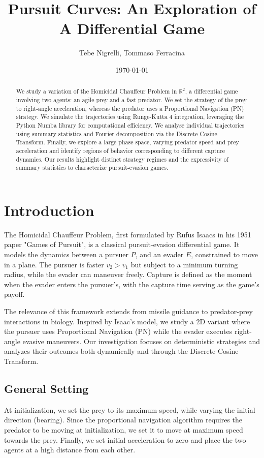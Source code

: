 \documentclass[11pt, twocolumn]{article}
\begin{document}
\title{Pursuit Curves: An Exploration of A Differential Game}

\author{Tebe Nigrelli, Tommaso Ferracina}
\date{\today}

\maketitle

\begin{abstract}
  We study a variation of the Homicidal Chauffeur Problem in $\mathbb{R}^2$, a differential game involving two agents: an agile prey and a fast predator. We set the strategy of the prey to right-angle acceleration, whereas the predator uses a Proportional Navigation (PN) strategy. We simulate the trajectories using Runge-Kutta 4 integration, leveraging the Python Numba library for computational efficiency. We analyse individual trajectories using summary statistics and Fourier decomposition via the Discrete Cosine Transform. Finally, we explore a large phase space, varying predator speed and prey acceleration and identify regions of behavior corresponding to different capture dynamics. Our results highlight distinct strategy regimes and the expressivity of summary statistics to characterize pursuit-evasion games.
\end{abstract}

\section{Introduction}
The Homicidal Chauffeur Problem, first formulated by Rufus Isaacs in his 1951 paper "Games of Pursuit", is a classical pursuit-evasion differential game. It models the dynamics between a pursuer $P$, and an evader $E$, constrained to move in a plane. The pursuer is faster $v_2 > v_1$ but subject to a minimum turning radius, while the evader can maneuver freely. Capture is defined as the moment when the evader enters the pursuer's, with the capture time serving as the game's payoff.

The relevance of this framework extends from missile guidance to predator-prey interactions in biology. Inspired by Isaac's model, we study a 2D variant where the pursuer uses Proportional Navigation (PN) while the evader executes right-angle evasive maneuvers. Our investigation focuses on deterministic strategies and analyzes their outcomes both dynamically and through the Discrete Cosine Transform.

\subsection{General Setting}
At initialization, we set the prey to its maximum speed, while varying the initial direction (bearing). Since the proportional navigation algorithm requires the predator to be moving at initialization, we set it to move at maximum speed towards the prey. Finally, we set initial acceleration to zero and place the two agents at a high distance from each other.
\end{document}

